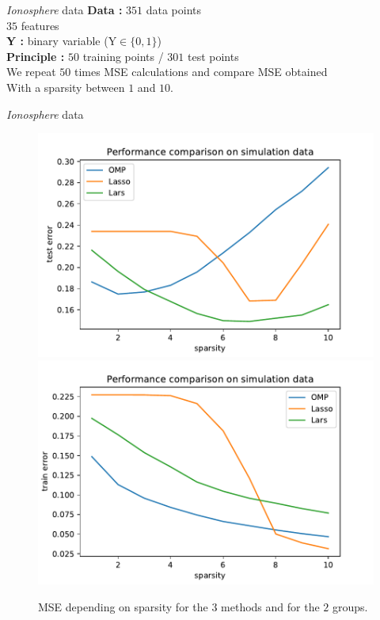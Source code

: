 \documentclass[unknownkeysallowed]{beamer}
\begin{document}
\begin{frame}{\textit{Ionosphere} data}
\textbf{Data : }$351$ data points\\
\hspace{1.2cm}  $35$ features\\
\vspace{0.5cm}
\textbf{Y : }binary variable (Y$\in \{0,1\}$)\\
\vspace{0.5cm}
\textbf{Principle : }$50$ training points / $301$ test points\\
We repeat $50$ times MSE calculations and compare MSE obtained\\
With a sparsity between $1$ and $10$.
\end{frame}

\begin{frame}{\textit{Ionosphere} data}
\begin{figure}
    \centering
    \includegraphics[scale=0.35]{./images/test_error_ionosphere.pdf}
    \includegraphics[scale=0.35]{./images/training_error_ionosphere.pdf}
    \caption{MSE depending on sparsity for the $3$ methods and for the $2$ groups.}
\end{figure}
\end{frame}
\end{document}
